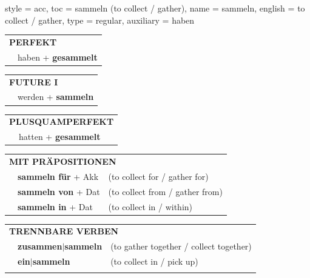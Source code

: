 \begin{verbentry}{
  style = {acc},
  toc = {sammeln (to collect / gather)},
  name = {sammeln},
  english = {to collect / gather},
  type = {regular},
  auxiliary = {haben}
}
 \begin{tabular}{rl}
     \multicolumn{2}{l}{\textbf{PERFEKT}}\\
   & haben + \textbf{gesammelt}\\
  \end{tabular}
\hfill
\begin{tabular}{rl}
    \multicolumn{2}{l}{\textbf{FUTURE I}}\\
   & werden + \textbf{sammeln}\\
  \end{tabular}
\hfill
\begin{tabular}{rl}
    \multicolumn{2}{l}{\textbf{PLUSQUAMPERFEKT}}\\
   & hatten + \textbf{gesammelt}\\
  \end{tabular}

 \vspace{10pt}

\begin{tabular}{lll}
      \multicolumn{3}{l}{\textbf{MIT PRÄPOSITIONEN}}\\
& \textbf{sammeln für} + Akk & (to collect for / gather for)\\
& \textbf{sammeln von} + Dat & (to collect from / gather from)\\
& \textbf{sammeln in} + Dat & (to collect in / within)\\
\end{tabular}
  \hfill
\begin{tabular}{lll}
      \multicolumn{3}{l}{\textbf{TRENNBARE VERBEN}}\\
 & \textbf{zusammen$|$sammeln} & (to gather together / collect together)\\
 & \textbf{ein$|$sammeln} & (to collect in / pick up)\\
\vspace{10pt}
  \end{tabular}

  \vspace{-5pt}
\end{verbentry}

